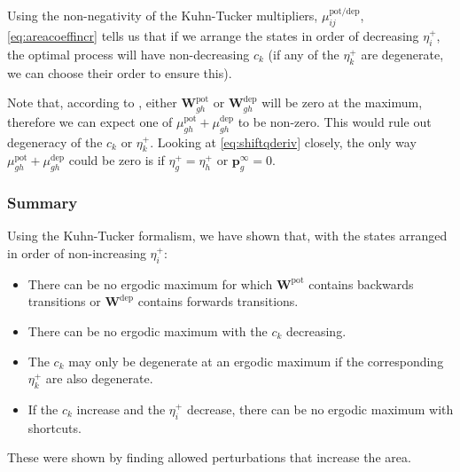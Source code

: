\documentclass{article} %
\newcommand{\pr}{\mathbf{p}}
\newcommand{\eq}{\pr^\infty}
\newcommand{\w}{\mathbf{w}}
\newcommand{\W}{\mathbf{W}}
\newcommand{\pot}{^{\text{pot}}}
\newcommand{\dep}{^{\text{dep}}}
\newcommand{\potdep}{^{\text{pot/dep}}}
\begin{document}
Using the non-negativity of the Kuhn-Tucker multipliers, $\mu\potdep _{ij}$, \eqref{eq:areacoeffincr} tells us that if we arrange the states in order of decreasing $\eta^+_i$, the optimal process will have non-decreasing $c_k$ (if any of the $\eta^+_k$ are degenerate, we can choose their order to ensure this).

Note that, according to , either $\W\pot _{gh}$ or $\W\dep _{gh}$ will be zero at the maximum, therefore we can expect one of $\mu\pot _{gh}+\mu\dep _{gh}$ to be non-zero.
This would rule out degeneracy of the $c_k$ or $\eta^+_k$.
Looking at \eqref{eq:shiftqderiv} closely, the only way $\mu\pot _{gh}+\mu\dep _{gh}$ could be zero is if $\eta^+_g=\eta^+_h$ or $\eq_g=0$.



\subsubsection{Summary}\label{sec:KTsummary}

Using the Kuhn-Tucker formalism, we have shown that,
with the states arranged in order of non-increasing $\eta^+_i$:
%
\begin{itemize}
  \item There can be no ergodic maximum for which $\W\pot $ contains backwards transitions or $\W\dep $ contains forwards transitions.
  \item There can be no ergodic maximum with the $c_k$ decreasing.
  \item The $c_k$ may only be degenerate at an ergodic maximum if the corresponding $\eta^+_k$ are also degenerate.
  \item If the $c_k$ increase and the $\eta^+_i$ decrease, there can be no ergodic maximum with shortcuts.
\end{itemize}
%
These were shown by finding allowed perturbations that increase the area.
\end{document}
